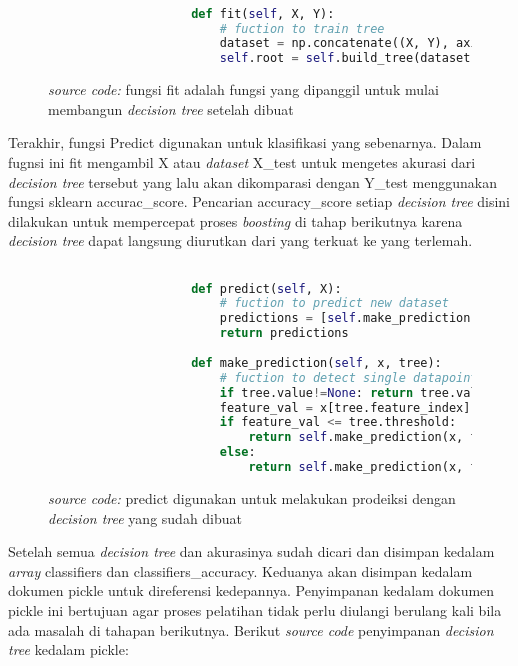 		\begin{figure}[H]
			\begin{lstlisting}[language=Python, basicstyle=\tiny]

					def fit(self, X, Y):
						# fuction to train tree 
						dataset = np.concatenate((X, Y), axis = 1)
						self.root = self.build_tree(dataset)

			\end{lstlisting}
			\caption{\emph{source code:} fungsi fit adalah fungsi yang dipanggil untuk mulai membangun \emph{decision tree}
			setelah dibuat}
			\label{code: fit function}
		\end{figure}

		Terakhir, fungsi Predict digunakan untuk klasifikasi yang sebenarnya. Dalam fugnsi ini 
		fit mengambil X atau \textit{dataset} X\_test untuk mengetes akurasi dari \emph{decision tree} 
		tersebut yang lalu akan dikomparasi dengan Y\_test menggunakan fungsi sklearn accurac\_score. 
		Pencarian accuracy\_score setiap \emph{decision tree} disini dilakukan untuk 
		mempercepat proses \emph{boosting} di tahap berikutnya karena \emph{decision tree} 
		dapat langsung diurutkan dari yang terkuat ke yang terlemah.

		\begin{figure}[H]
			\begin{lstlisting}[language=Python, basicstyle=\tiny]

					def predict(self, X):
						# fuction to predict new dataset 
						predictions = [self.make_prediction(x, self.root) for x in X]
						return predictions
					
					def make_prediction(self, x, tree):
						# fuction to detect single datapoint
						if tree.value!=None: return tree.value
						feature_val = x[tree.feature_index]
						if feature_val <= tree.threshold:
							return self.make_prediction(x, tree.left)
						else:
							return self.make_prediction(x, tree.right)
			\end{lstlisting}
			\caption{\emph{source code:} predict digunakan untuk melakukan prodeiksi 
			dengan \emph{decision tree} yang sudah dibuat}
			\label{code: predict function}
		\end{figure}

		Setelah semua \emph{decision tree} dan akurasinya sudah dicari dan disimpan kedalam 
		\textit{array} classifiers dan classifiers\_accuracy. Keduanya akan disimpan kedalam 
		dokumen pickle untuk direferensi kedepannya. Penyimpanan kedalam dokumen pickle ini bertujuan 
		agar proses pelatihan tidak perlu diulangi berulang kali bila ada masalah di tahapan berikutnya. 
		Berikut \textit{source code} penyimpanan \emph{decision tree} kedalam pickle:

